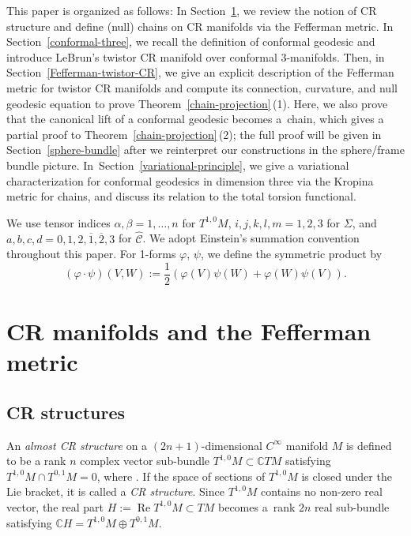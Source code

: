 \documentclass[pdftex]{sigma}
\newcommand\ol{\overline}
\newcommand{\wh}{\widehat}
\numberwithin{equation}{section}
\begin{document}
This paper is organized as follows: In Section~\ref{CR}, we review the notion of CR structure and define (null) chains on CR manifolds via the Fefferman metric. In Section~\ref{conformal-three}, we recall the definition of conformal geodesic and introduce LeBrun's twistor CR manifold over conformal $3$-manifolds. Then, in Section~\ref{Fefferman-twistor-CR}, we give an explicit description of the Fefferman metric for twistor CR manifolds and compute its connection, curvature, and null geodesic equation to prove Theorem~\ref{chain-projection}\,(1). Here, we also prove that the canonical lift of a conformal geodesic becomes a~chain, which gives a partial proof to Theorem~\ref{chain-projection}\,(2); the full proof will be given in Section~\ref{sphere-bundle} after we reinterpret our constructions in the sphere/frame bundle picture. In~Section~\ref{variational-principle}, we give a variational characterization for conformal geodesics in dimension three via the Kropina metric for chains, and discuss its relation to the total torsion functional.

\begin{Notation}
We use tensor indices $\alpha, \beta =1, \dots, n$ for $T^{1, 0}M$, $i, j, k, l, m =1, 2, 3$ for $\Sigma$, and $a, b, c, d =0, 1, 2, \ol1, \ol2, 3$ for $\wh{\mathcal{C}}$. We adopt Einstein's summation convention throughout this paper.
For 1-forms $\varphi$, $\psi$, we define the symmetric product by
\[
(\varphi\cdot\psi)(V, W):=\frac{1}{2} (\varphi(V)\psi(W)+\varphi(W)\psi(V)).
\]
\end{Notation}

\section{CR manifolds and the Fefferman metric}\label{CR}
\subsection{CR structures}
An {\it almost CR structure} on a $(2n+1)$-dimensional $C^\infty$ manifold $M$ is defined to be a rank $n$ complex vector sub-bundle $T^{1, 0}M\subset\mathbb{C}TM$ satisfying $T^{1, 0}M\cap T^{0, 1}M=0$, where \smash{${T^{0, 1}M:=\ol{T^{1, 0}M}}$}. If the space of sections of $T^{1, 0}M$ is closed under the Lie bracket, it is called a {\it CR structure}. Since $T^{1, 0}M$ contains no non-zero real vector, the real part $H:=\operatorname{Re} T^{1, 0}M\subset TM$ becomes a~rank $2n$ real sub-bundle satisfying $\mathbb{C}H=T^{1, 0}M\oplus T^{0,1}M$.
\end{document}
